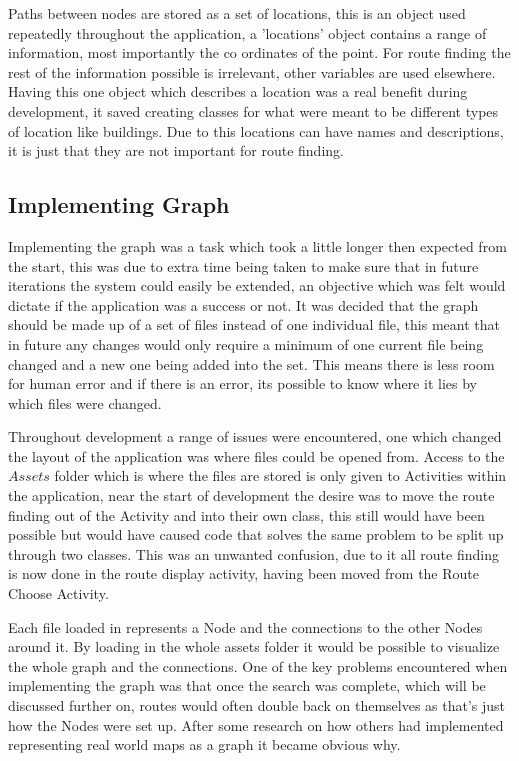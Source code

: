 Paths between nodes are stored as a set of locations, this is an object used repeatedly throughout the application, a 'locations' object contains a range of information, most importantly the co ordinates of the point. For route finding the rest of the information possible is irrelevant, other variables are used elsewhere. Having this one object which describes a location was a real benefit during development, it saved creating classes for what were meant to be different types of location like buildings. Due to this locations can have names and descriptions, it is just that they are not important for route finding. 

\subsection{Implementing Graph}

Implementing the graph was a task which took a little longer then expected from the start, this was due to extra time being taken to make sure that in future iterations the system could easily be extended, an objective which was felt would dictate if the application was a success or not. It was decided that the graph should be made up of a set of files instead of one individual file, this meant that in future any changes would only require a minimum of one current file being changed and a new one being added into the set. This means there is less room for human error and if there is an error, its possible to know where it lies by which files were changed. 

Throughout development a range of issues were encountered, one which changed the layout of the application was where files could be opened from. Access to the $Assets$ folder which is where the files are stored is only given to Activities within the application, near the start of development the desire was to move the route finding out of the Activity and into their own class, this still would have been possible but would have caused code that solves the same problem to be split up through two classes. This was an unwanted confusion, due to it all route finding is now done in the route display activity, having been moved from the Route Choose Activity. 

Each file loaded in represents a Node and the connections to the other Nodes around it. By loading in the whole assets folder it would be possible to visualize the whole graph and the connections. One of the key problems encountered when implementing the graph was that once the search was complete, which will be discussed further on, routes would often double back on themselves as that's just how the Nodes were set up. After some research on how others had implemented representing real world maps as a graph it became obvious why.

